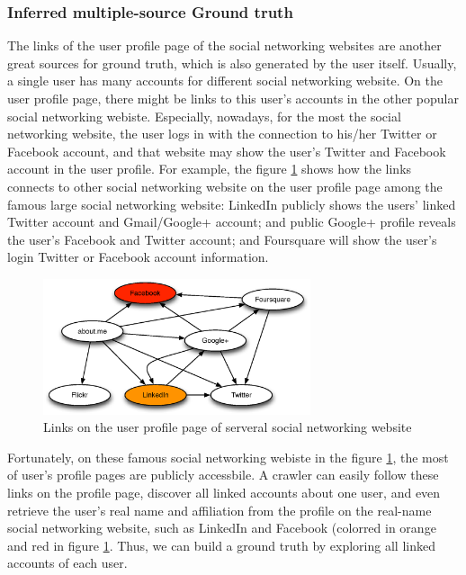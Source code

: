 \documentclass[11pt,letterpaper]{article}
\begin{document}
\subsubsection{Inferred multiple-source Ground truth}

The links of the user profile page of the social networking websites are another great sources for ground truth, which is also generated by the user itself. Usually, a single user has many accounts for different social networking website. On the user profile page, there might be links to this user's accounts in the other popular social networking webiste. Especially, nowadays, for the most the social networking website, the user logs in with the connection to his/her Twitter or Facebook account, and that website may show the user's Twitter and Facebook account in the user profile. For example, the figure \ref{fig:infer} shows how the links connects to other social networking website on the user profile page among the famous large social networking website: LinkedIn publicly shows the users' linked Twitter account and Gmail/Google+ account; and public Google+ profile reveals the user's Facebook and Twitter account; and Foursquare will show the user's login Twitter or Facebook account information. 

\begin{figure}[h!]
\centering
\caption{Links on the user profile page of serveral social networking website}
\label{fig:infer}
\includegraphics[width=0.7\textwidth]{infer.eps}
\end{figure}


Fortunately, on these famous social networking webiste in the figure \ref{fig:infer}, the most of user's profile pages are publicly accessbile. A crawler can easily follow these links on the profile page, discover all linked accounts about one user, and even retrieve the user's real name and affiliation from the profile on the real-name social networking website, such as LinkedIn and Facebook (colorred in orange and red in figure \ref{fig:infer}. Thus, we can build a ground truth by exploring all linked accounts of each user. 
\end{document}
